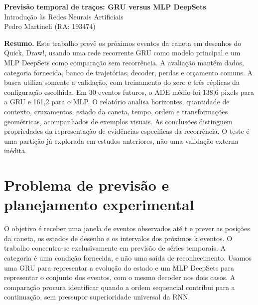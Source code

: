 \documentclass[11pt,a4paper]{article}
\begin{document}
\begin{center}{\Large\bfseries\color{ink} Previsão temporal de traços: GRU versus MLP DeepSets}\\[5pt]
Introdução às Redes Neurais Artificiais\\Pedro Martineli (RA: 193474)
\end{center}\textbf{Resumo.} Este trabalho prevê os próximos eventos da caneta em desenhos do Quick, Draw!, usando uma rede recorrente GRU como modelo principal e um MLP DeepSets como comparação sem recorrência. A avaliação mantém dados, categoria fornecida, banco de trajetórias, decoder, perdas e orçamento comuns. A busca utiliza somente a validação, com treinamento do zero e três réplicas da configuração escolhida. Em 30 eventos futuros, o ADE médio foi 138,6 pixels para a GRU e 161,2 para o MLP. O relatório analisa horizontes, quantidade de contexto, cruzamentos, estado da caneta, tempo, ordem e transformações geométricas, acompanhados de exemplos visuais. As conclusões distinguem propriedades da representação de evidências específicas da recorrência. O teste é uma partição já explorada em estudos anteriores, não uma validação externa inédita.
\section{Problema de previsão e planejamento experimental}
O objetivo é receber uma janela de eventos observados até t e prever as posições da caneta, os estados de desenho e os intervalos dos próximos k eventos. O trabalho concentra-se exclusivamente em previsão de séries temporais. A categoria é uma condição fornecida, e não uma saída de reconhecimento. Usamos uma GRU para representar a evolução do estado e um MLP DeepSets para representar o conjunto dos eventos, com o mesmo decoder nos dois casos. A comparação procura identificar quando a ordem sequencial contribui para a continuação, sem pressupor superioridade universal da RNN.
\end{document}
